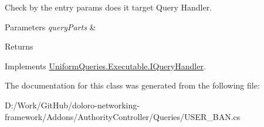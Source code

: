 Check by the entry params does it target Query Handler. 


\begin{DoxyParams}{Parameters}
{\em query\+Parts} & \\
\hline
\end{DoxyParams}
\begin{DoxyReturn}{Returns}

\end{DoxyReturn}


Implements \mbox{\hyperlink{interface_uniform_queries_1_1_executable_1_1_i_query_handler_a0f43184bf3e306a7cbebc39098f044ee}{Uniform\+Queries.\+Executable.\+I\+Query\+Handler}}.



The documentation for this class was generated from the following file\+:\begin{DoxyCompactItemize}
\item 
D\+:/\+Work/\+Git\+Hub/doloro-\/networking-\/framework/\+Addons/\+Authority\+Controller/\+Queries/U\+S\+E\+R\+\_\+\+B\+A\+N.\+cs\end{DoxyCompactItemize}
